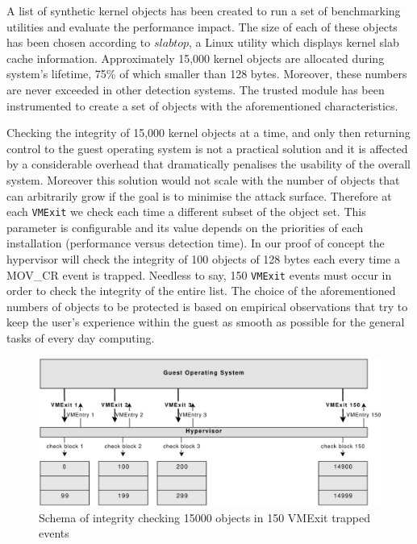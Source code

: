 %
%
A list of synthetic kernel objects has been created to run a set of benchmarking utilities and evaluate the performance impact. The size of each of these objects has been chosen according to $slabtop$, a Linux utility which displays kernel slab cache information. Approximately 15,000 kernel objects are allocated during system's lifetime, 75\% of which smaller than 128 bytes. Moreover, these numbers are never exceeded in other detection systems.
The trusted module has been instrumented to create a set of objects with the aforementioned characteristics. 

Checking the integrity of 15,000 kernel objects at a time, and only then returning control to the guest operating system is not a practical solution and it is affected by a considerable overhead that dramatically penalises the usability of the overall system. Moreover this solution would not scale with the number of objects that can arbitrarily grow if the goal is to minimise the attack surface. Therefore at each \texttt{VMExit} we check each time a different subset of the object set. This parameter is configurable and its value depends on the priorities of each installation (performance versus detection time). 
In our proof of concept the hypervisor will check the integrity of 100 objects of 128 bytes each every time a MOV\_CR event is trapped. Needless to say, 150 \texttt{VMExit} events must occur in order to check the integrity of the entire list. The choice of the aforementioned numbers of objects to be protected is based on empirical observations that try to keep the user's experience within the guest as smooth as possible for the general tasks of every day computing. 

\begin{figure}[htbp] 
\begin{center}
\includegraphics[scale=0.45]{images/hr_relax.pdf}
\caption{{Schema of integrity checking 15000 objects in 150 VMExit trapped events}}
\label{schema_hr_relax}
\end{center}
\end{figure}

